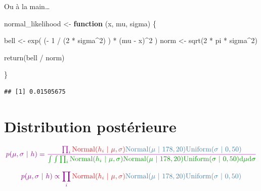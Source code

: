 \documentclass[
  a4paper,11pt,twoside,onecolumn,openright,final,oldfontcommands]{memoir}
\newenvironment{Shaded}{\begin{snugshade}}{\end{snugshade}}
\newcommand{\ControlFlowTok}[1]{\textcolor[rgb]{0.13,0.29,0.53}{\textbf{#1}}}
\newcommand{\DecValTok}[1]{\textcolor[rgb]{0.00,0.00,0.81}{#1}}
\newcommand{\FunctionTok}[1]{\textcolor[rgb]{0.00,0.00,0.00}{#1}}
\newcommand{\NormalTok}[1]{#1}
\newcommand{\OtherTok}[1]{\textcolor[rgb]{0.56,0.35,0.01}{#1}}
\newcommand{\SpecialCharTok}[1]{\textcolor[rgb]{0.00,0.00,0.00}{#1}}
\theoremstyle{definition}
\theoremstyle{definition}
\theoremstyle{definition}
\theoremstyle{remark}
\begin{document}
Ou à la main\ldots{}

\begin{Shaded}
\begin{Highlighting}[]
\NormalTok{normal\_likelihood }\OtherTok{\textless{}{-}} \ControlFlowTok{function}\NormalTok{ (x, mu, sigma) \{}
  
\NormalTok{  bell }\OtherTok{\textless{}{-}} \FunctionTok{exp}\NormalTok{( (}\SpecialCharTok{{-}} \DecValTok{1} \SpecialCharTok{/}\NormalTok{ (}\DecValTok{2} \SpecialCharTok{*}\NormalTok{ sigma}\SpecialCharTok{\^{}}\DecValTok{2}\NormalTok{) ) }\SpecialCharTok{*}\NormalTok{ (mu }\SpecialCharTok{{-}}\NormalTok{ x)}\SpecialCharTok{\^{}}\DecValTok{2}\NormalTok{ )}
\NormalTok{  norm }\OtherTok{\textless{}{-}} \FunctionTok{sqrt}\NormalTok{(}\DecValTok{2} \SpecialCharTok{*}\NormalTok{ pi }\SpecialCharTok{*}\NormalTok{ sigma}\SpecialCharTok{\^{}}\DecValTok{2}\NormalTok{)}
  
  \FunctionTok{return}\NormalTok{(bell }\SpecialCharTok{/}\NormalTok{ norm)}
  
\NormalTok{\}}
\end{Highlighting}
\end{Shaded}

\begin{Shaded}
\end{Shaded}

\begin{verbatim}
## [1] 0.01505675
\end{verbatim}

\hypertarget{distribution-postuxe9rieure}{%
\section{Distribution postérieure}\label{distribution-postuxe9rieure}}

\[
\color{purple}{p(\mu, \sigma \ | \ h)} = \frac{\prod_{i} \color{orangered}{\mathrm{Normal}(h_{i} \ | \ \mu, \sigma)}\color{steelblue}{\mathrm{Normal}(\mu \ | \ 178, 20)\mathrm{Uniform}(\sigma \ | \ 0, 50)}}
{\color{green}{\int \int \prod_{i} \mathrm{Normal}(h_{i} \ | \ \mu, \sigma)\mathrm{Normal}(\mu \ | \ 178, 20)\mathrm{Uniform}(\sigma \ | \ 0, 50) \mathrm{d} \mu \mathrm{d} \sigma}}
\]

\[
\color{purple}{p(\mu, \sigma \ | \ h)} \propto \prod_{i} \color{orangered}{\mathrm{Normal}(h_{i} \ | \ \mu, \sigma)}\color{steelblue}{\mathrm{Normal}(\mu \ | \ 178, 20)\mathrm{Uniform}(\sigma \ | \ 0, 50)}
\]
\end{document}
